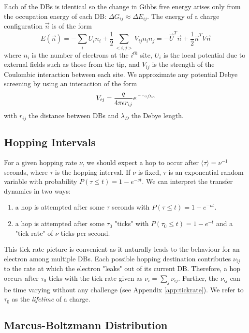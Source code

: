 \documentclass[11pt]{article}
\newcommand{\expect}[1]{\langle #1 \rangle}
\begin{document}
Each of the DBs is identical so the change in Gibbs free energy arises only from the occupation energy of each DB: $\Delta G_{ij} \approx \Delta E_{ij}$. The energy of a charge configuration $\vec{n}$ is of the form
\begin{equation}
E(\vec{n}) = -\sum_i U_i n_i + \frac{1}{2} \sum_{<i,j>} V_{ij}n_in_j = -\vec{U}^T\vec{n} + \frac{1}{2}\vec{n}^T V \vec{n}
\end{equation}
where $n_i$ is the number of electrons at the $i^{th}$ site, $U_i$ is the local potential due to external fields such as those from the tip, and $V_{ij}$ is the strength of the Coulombic interaction between each site. We approximate any potential Debye screening by using an interaction of the form
\begin{equation}
V_{ij} = \frac{q}{4\pi\epsilon r_{ij}}e^{\sfrac{-r_{ij}}{\lambda_D}}
\end{equation}
with $r_{ij}$ the distance between DBs and $\lambda_D$ the Debye length.

\subsection{Hopping Intervals}

For a given hopping rate $\nu$, we should expect a hop to occur after $\expect{\tau} = \nu^{-1}$ seconds, where $\tau$ is the hopping interval. If $\nu$ is fixed, $\tau$ is an exponential random variable with probability $P(\tau \leq t) = 1-e^{-\nu t}$. We can interpret the transfer dynamics in two ways:
\begin{enumerate}
 \item a hop is attempted after some $\tau$ seconds with $P(\tau \leq t) = 1-e^{-\nu t}$.
 \item a hop is attempted after some $\tau_0$ "ticks" with $P(\tau_0 \leq t) = 1-e^{-t}$ and a "tick rate" of $\nu$ ticks per second.
\end{enumerate}
This tick rate picture is convenient as it naturally leads to the behaviour for an electron among multiple DBs. Each possible hopping destination contributes $\nu_{ij}$ to the rate at which the electron "leaks" out of its current DB. Therefore, a hop occurs after $\tau_0$ ticks with the tick rate given as $\nu_i = \sum_j \nu_{ij}$. Further, the $\nu_{ij}$ can be time varying without any challenge (see Appendix \ref{app:tickrate}). We refer to $\tau_0$ as the \emph{lifetime} of a charge.

\subsection{Marcus-Boltzmann Distribution}
\end{document}
